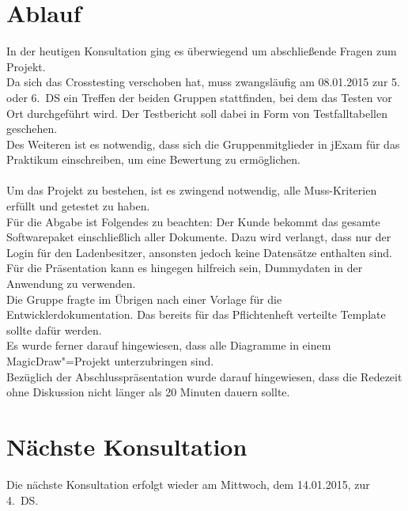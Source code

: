 \documentclass{scrartcl}
\begin{document}
\section{Ablauf}
In der heutigen Konsultation ging es überwiegend um abschließende Fragen zum Projekt.\\
Da sich das Crosstesting verschoben hat, muss zwangsläufig am 08.01.2015 zur 5. oder 6.~DS ein Treffen der beiden Gruppen stattfinden, bei dem das Testen vor Ort durchgeführt wird. Der Testbericht soll dabei in Form von Testfalltabellen geschehen.\\
Des Weiteren ist es notwendig, dass sich die Gruppenmitglieder in jExam für das Praktikum einschreiben, um eine Bewertung zu ermöglichen.\\\\
Um das Projekt zu bestehen, ist es zwingend notwendig, alle Muss-Kriterien erfüllt und getestet zu haben.\\
Für die Abgabe ist Folgendes zu beachten: Der Kunde bekommt das gesamte Softwarepaket einschließlich aller Dokumente. Dazu wird verlangt, dass nur der Login für den Ladenbesitzer, ansonsten jedoch keine Datensätze enthalten sind. Für die Präsentation kann es hingegen hilfreich sein, Dummydaten in der Anwendung zu verwenden.\\
Die Gruppe fragte im Übrigen nach einer Vorlage für die Entwicklerdokumentation. Das bereits für das Pflichtenheft verteilte Template sollte dafür werden.\\
Es wurde ferner darauf hingewiesen, dass alle Diagramme in einem MagicDraw"=Projekt unterzubringen sind.\\
Bezüglich der Abschlusspräsentation wurde darauf hingewiesen, dass die Redezeit ohne Diskussion nicht länger als 20 Minuten dauern sollte.

\vspace{1em}

\section{Nächste Konsultation}
Die nächste Konsultation erfolgt wieder am Mittwoch, dem 14.01.2015, zur 4.~DS.
\end{document}
